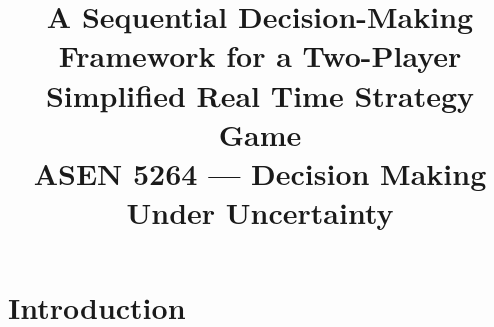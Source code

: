 \documentclass[conference]{IEEEtran}
\begin{document}
\title{A Sequential Decision-Making Framework for a Two-Player Simplified Real Time Strategy Game\\
{\normalsize ASEN 5264 --- Decision Making Under Uncertainty}}

\author{
  \and
}

\maketitle
\pagestyle{plain}

\section{Introduction}
\end{document}

